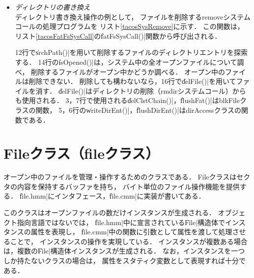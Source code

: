 \begin{itemize}
\item \emph{ディレクトリの書き換え} \\
  ディレクトリ書き換え操作の例として，
  ファイルを削除するremoveシステムコールの処理プログラムを
  リスト\ref{tacosSysRemove}に示す．
  この関数は，
  リスト\ref{tacosFatFsSysCall}の\|fatFsSysCall()|関数から呼び出される．

  12行で\|srchPath()|を用いて削除するファイルのディレクトリエントリを探索する．
  14行の\|isOpened()|は，システム中の全オープンファイルについて調べ，
  削除するファイルがオープン中かどうか調べる．
  オープン中のファイルは削除できない．
  削除しても構わないなら，16行で\|delFile()|を用いてファイルを消す．
  \|delFile()|はディレクトリの削除（rmdirシステムコール）からも使用される．
  3，7行で使用される\|delClstChain()|，\|flushFat()|はblkFileクラスの関数，
  5，6行の\|writeDirEnt()|，\|flushDirEnt()|はdirAccessクラスの関数である．

  

\end{itemize}

\section{Fileクラス（fileクラス）}
オープン中のファイルを管理・操作するためのクラスである．
Fileクラスはセクタの内容を保持するバッファを持ち，
バイト単位のファイル操作機能を提供する．
\|file.hmm|にインタフェース，\|file.cmm|に実装が書いてある．

このクラスはオープンファイルの数だけインスタンスが生成される．
オブジェクト指向言語ではない{\cmm}では，
\|file.hmm|中に宣言されている\|File|構造体でインスタンスの属性を表現し，
\|file.cmm|中の関数に引数として属性を渡して処理させることで，
インスタンスの操作を実現している．
インスタンスが複数ある場合は，複数の\|File|構造体インスタンスが生成される．
なお，インスタンスを一つしか持たないクラスの場合は，
属性をスタティク変数として表現すれば十分である．

